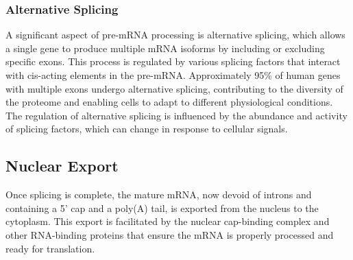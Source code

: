 \subsubsection{Alternative Splicing}
A significant aspect of pre-mRNA processing is alternative splicing, which
allows a single gene to produce multiple mRNA isoforms by including or
excluding specific exons.
This process is regulated by various splicing factors that interact with
cis-acting elements in the
pre-mRNA\supercite{le_alternative_2015,murphy_therapeutic_2022}.
Approximately 95\% of human genes with multiple exons undergo alternative
splicing, contributing to the diversity of the proteome and enabling cells to
adapt to different physiological conditions\supercite{le_alternative_2015}.
The regulation of alternative splicing is influenced by the abundance and
activity of splicing factors, which can change in response to cellular
signals\supercite{wang_mechanism_2015}.

\subsection{Nuclear Export}
Once splicing is complete, the mature mRNA, now devoid of introns and
containing a 5' cap and a poly(A) tail, is exported from the nucleus to the
cytoplasm.
This export is facilitated by the nuclear cap-binding complex and other
RNA-binding proteins that ensure the mRNA is properly processed and ready for
translation\supercite{soucek_evolutionarily_2016}.
